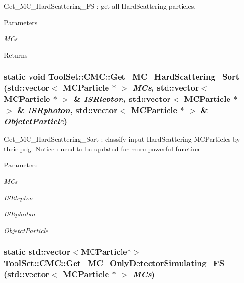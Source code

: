 Get\_\-MC\_\-HardScattering\_\-FS : get all HardScattering particles. 
\begin{DoxyParams}{Parameters}
\item[{\em MCs}]\end{DoxyParams}
\begin{DoxyReturn}{Returns}

\end{DoxyReturn}
\hypertarget{classToolSet_1_1CMC_abf41aa5efde937a3e21fa3b24323d570}{
\subsubsection[{Get\_\-MC\_\-HardScattering\_\-Sort}]{\setlength{\rightskip}{0pt plus 5cm}static void ToolSet::CMC::Get\_\-MC\_\-HardScattering\_\-Sort (std::vector$<$ MCParticle $\ast$ $>$ {\em MCs}, \/  std::vector$<$ MCParticle $\ast$ $>$ \& {\em ISRlepton}, \/  std::vector$<$ MCParticle $\ast$ $>$ \& {\em ISRphoton}, \/  std::vector$<$ MCParticle $\ast$ $>$ \& {\em ObjetctParticle})}}
\label{classToolSet_1_1CMC_abf41aa5efde937a3e21fa3b24323d570}


Get\_\-MC\_\-HardScattering\_\-Sort : classify input HardScattering MCParticles by their pdg. Notice : need to be updated for more powerful function 
\begin{DoxyParams}{Parameters}
\item[{\em MCs}]\item[{\em ISRlepton}]\item[{\em ISRphoton}]\item[{\em ObjetctParticle}]\end{DoxyParams}
\hypertarget{classToolSet_1_1CMC_a766e7761a6db662243c7490a615c380e}{
\subsubsection[{Get\_\-MC\_\-OnlyDetectorSimulating\_\-FS}]{\setlength{\rightskip}{0pt plus 5cm}static std::vector$<$MCParticle$\ast$$>$ ToolSet::CMC::Get\_\-MC\_\-OnlyDetectorSimulating\_\-FS (std::vector$<$ MCParticle $\ast$ $>$ {\em MCs})}}
\label{classToolSet_1_1CMC_a766e7761a6db662243c7490a615c380e}


